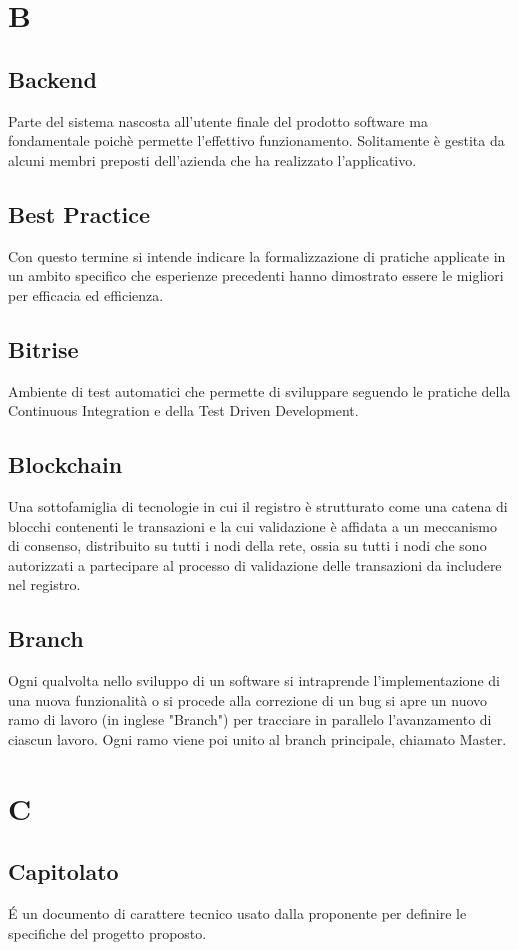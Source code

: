 \section{B}
\subsection*{Backend} Parte del sistema nascosta all'utente finale del prodotto software ma fondamentale poichè permette l'effettivo funzionamento. Solitamente è gestita da alcuni membri preposti dell'azienda che ha realizzato l'applicativo.
\subsection*{Best Practice} Con questo termine si intende  indicare la formalizzazione di pratiche applicate in un ambito specifico che esperienze precedenti hanno dimostrato essere le migliori per efficacia ed efficienza.
\subsection*{Bitrise} Ambiente di test automatici che permette di sviluppare seguendo le pratiche della Continuous Integration e della Test Driven Development.
\subsection*{Blockchain} Una sottofamiglia di tecnologie in cui il registro è strutturato come una catena di blocchi contenenti le transazioni e la cui validazione è affidata a un meccanismo di consenso, distribuito su tutti i nodi della rete, ossia su tutti i nodi che sono autorizzati a partecipare al processo di validazione delle transazioni da includere nel registro.
\subsection*{Branch} Ogni qualvolta nello sviluppo di un software si intraprende l'implementazione di una nuova funzionalità o si procede alla correzione di un bug si apre un nuovo ramo di lavoro (in inglese "Branch") per tracciare in parallelo l'avanzamento di ciascun lavoro. Ogni ramo viene poi unito al branch principale, chiamato Master.
\newpage
\section{C}
\subsection*{Capitolato} É un documento di carattere tecnico usato dalla proponente per definire le specifiche del progetto proposto.
